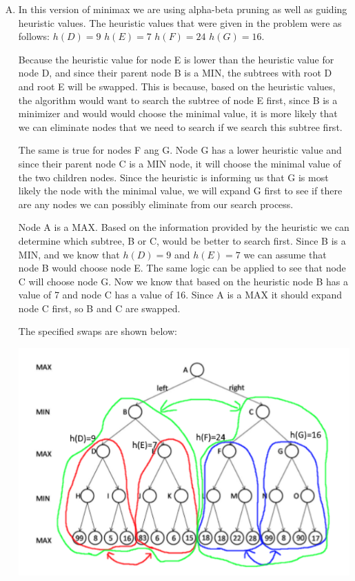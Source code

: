 \documentclass[10pt,a4paper]{article}
\begin{document}
\begin{enumerate}[A.]
		\item
		
		In this version of minimax we are using alpha-beta pruning as well as guiding heuristic values. The heuristic values that were given in the problem  were as follows: $h(D)=9$ $h(E)=7$ $h(F)=24$ $h(G)=16$. 
		
		Because the heuristic value for node E is lower than the heuristic value for node D, and since their parent node B is a MIN, the subtrees with root D and root E will be swapped. This is because, based on the heuristic values, the algorithm would want to search the subtree of node E first, since B is a minimizer and would would choose the minimal value, it is more likely that we can eliminate nodes that we need to search if we search this subtree first.
		
		The same is true for nodes F ang G. Node G has a lower heuristic value and since their parent node C is a MIN node, it will choose the minimal value of the two children nodes. Since the heuristic is informing us that G is most likely the node with the minimal value, we will expand G first to see if there are any nodes we can possibly eliminate from our search process.
		
		Node A is a MAX. Based on the information provided by the heuristic we can determine which subtree, B or C, would be better to search first. Since B is a MIN, and we know that $h(D)=9$ and $h(E)=7$ we can assume that node B would choose node E. The same logic can be applied to see that node C will choose node G. Now we know that based on the heuristic node B has a value of 7 and node C has a value of 16. Since A is a MAX it should expand node C first, so B and C are swapped.
		
		The specified swaps are shown below:
		
		\begin{center}
			\includegraphics[scale=0.5]{alphabeta_swaps}
		\end{center}
		

\end{enumerate}
\end{document}
